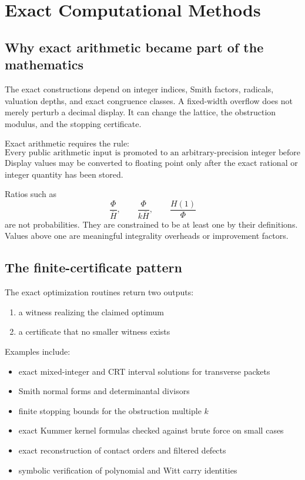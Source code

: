 \chapter{Exact Computational Methods}

\section{Why exact arithmetic became part of the mathematics}
The exact constructions depend on integer indices, Smith factors, radicals, valuation depths, and exact congruence classes. A fixed-width overflow does not merely perturb a decimal display. It can change the lattice, the obstruction modulus, and the stopping certificate.

Exact arithmetic requires the rule:
\[
\boxed{
\text{Every public arithmetic input is promoted to an arbitrary-precision integer before multiplication.}
}
\]
Display values may be converted to floating point only after the exact rational or integer quantity has been stored.

Ratios such as
\[
\frac{\Phi}{\overline H},
\qquad
\frac{\Phi}{k\overline H},
\qquad
\frac{H(1)}{\Phi}
\]
are not probabilities. They are constrained to be at least one by their definitions. Values above one are meaningful integrality overheads or improvement factors.

\section{The finite-certificate pattern}
The exact optimization routines return two outputs:
\begin{enumerate}[leftmargin=1.5em]
\item a witness realizing the claimed optimum
\item a certificate that no smaller witness exists
\end{enumerate}
Examples include:
\begin{itemize}[leftmargin=1.5em]
\item exact mixed-integer and CRT interval solutions for transverse packets
\item Smith normal forms and determinantal divisors
\item finite stopping bounds for the obstruction multiple $k$
\item exact Kummer kernel formulas checked against brute force on small cases
\item exact reconstruction of contact orders and filtered defects
\item symbolic verification of polynomial and Witt carry identities
\end{itemize}


